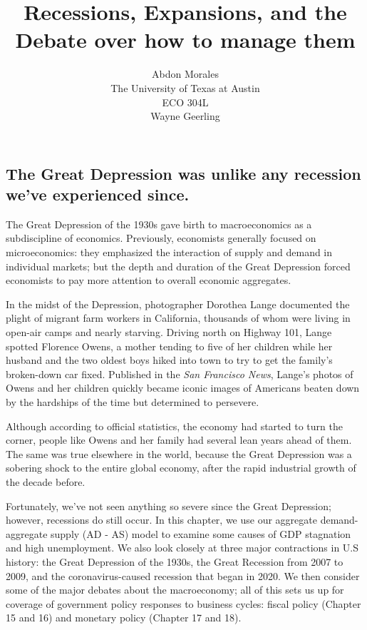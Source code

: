 \documentclass[11pt]{article} %
\title{Recessions, Expansions, and the Debate over how to manage them}
\author{Abdon Morales \\ The University of Texas at Austin \\ ECO 304L \\ Wayne Geerling}
\date{\date \\ Week 8 : Chapter 14}
\begin{document}
\maketitle
\subsection*{The Great Depression was unlike any recession we've experienced since.}
The Great Depression of the 1930s gave birth to macroeconomics as a subdiscipline of economics. Previously, economists generally focused on microeconomics: they emphasized the interaction of supply and demand in individual markets; but the depth and duration of the Great Depression forced economists to pay more attention to overall economic aggregates.

In the midst of the Depression, photographer Dorothea Lange documented the plight of migrant farm workers in California, thousands of whom were living in open-air camps and nearly starving. Driving north on Highway 101, Lange spotted Florence Owens, a mother tending to five of her children while her husband and the two oldest boys hiked into town to try to get the family's broken-down car fixed. Published in the \textit{San Francisco News}, Lange's photos of Owens and her children quickly became iconic images of Americans beaten down by the hardships of the time but determined to persevere.

Although according to official statistics, the economy had started to turn the corner, people like Owens and her family had several lean years ahead of them. The same was true elsewhere in the world, because the Great Depression was a sobering shock to the entire global economy, after the rapid industrial growth of the decade before.

Fortunately, we've not seen anything so severe since the Great Depression; however, recessions do still occur. In this chapter, we use our aggregate demand-aggregate supply (AD - AS) model to examine some causes of GDP stagnation and high unemployment. We also look closely at three major contractions in U.S history: the Great Depression of the 1930s, the Great Recession from 2007 to 2009, and the coronavirus-caused recession that began in 2020. We then consider some of the major debates about the macroeconomy; all of this sets us up for coverage of government policy responses to business cycles: fiscal policy (Chapter 15 and 16) and monetary policy (Chapter 17 and 18).
\end{document}
